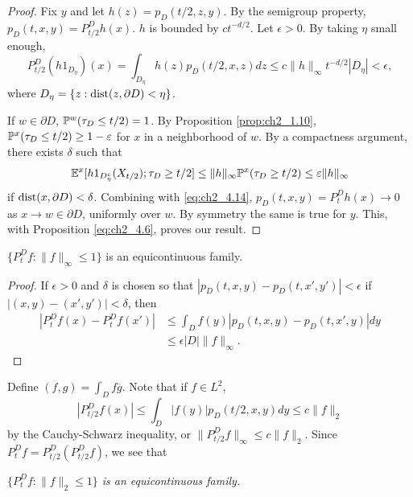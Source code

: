\begin{proof}
Fix $y$ and let $h(z) = p_D(t/2,z,y)$. By the semigroup property,
$p_D(t,x,y) = P_{t/2}^Dh(x)$. $h$ is bounded by $ct^{-d/2}$. Let $\epsilon > 0$. By taking $\eta$
small enough,
\begin{equation}\label{eq:ch2_4.14}
    P_{t/2}^D(h1_{D_\eta})(x) = \int_{D_\eta} h(z)p_D(t/2,x,z)dz \leq c\|h\|_\infty t^{-d/2}|D_\eta| < \epsilon,
\end{equation}
where $D_\eta = \{z : \dist(z,\partial D) < \eta\}$.

If $w \in \partial D$, $\P^w(\tau_D \leq t/2) = 1$. By Proposition \ref{prop:ch2_1.10}, $\P^x(\tau_D \leq t/2) \geq 1-\epsilon$ for $x$ in a neighborhood of $w$. By a compactness argument, there exists $\delta$ such that
\[
    \E^x[h1_{D_\eta^c}(X_{t/2});\tau_D \geq t/2] \leq \|h\|_\infty\P^x(\tau_D \geq t/2) \leq \epsilon\|h\|_\infty
\]
if $\dist(x,\partial D) < \delta$. Combining with \eqref{eq:ch2_4.14}, $p_D(t,x,y) = P_t^Dh(x) \to 0$ as $x \to w \in \partial D$, uniformly over $w$. By symmetry the same is true for $y$. This, with Proposition \eqref{eq:ch2_4.6}, proves our result.
\end{proof}

\begin{corollary}\label{cor:ch2_4.8}
$\{P_t^Df : \|f\|_\infty \leq 1\}$ is an equicontinuous family.
\end{corollary}

\begin{proof}
If $\epsilon > 0$ and $\delta$ is chosen so that $|p_D(t,x,y) - p_D(t,x',y')| < \epsilon$ if
$|(x,y) - (x',y')| < \delta$, then
\begin{align*}
    |P_t^Df(x) - P_t^Df(x')| &\leq \int_D f(y)|p_D(t,x,y) - p_D(t,x',y)|dy \\
    &\leq \epsilon|D| \|f\|_\infty.
\end{align*}
\end{proof}

Define $(f,g) = \int_D f\overline{g}$. Note that if $f \in L^2$,
\[
    |P_{t/2}^Df(x)| \leq \int_D |f(y)|p_D(t/2,x,y)dy \leq c\|f\|_2
\]
by the Cauchy-Schwarz inequality, or $\|P_{t/2}^Df\|_\infty \leq c\|f\|_2$. Since $P_t^Df = P_{t/2}^D(P_{t/2}^Df)$, we see that
\begin{obs}\label{obs:ch2_4.15}
    \textit{$\{P_t^Df : \|f\|_2 \leq 1\}$ is an equicontinuous family.}
\end{obs}


